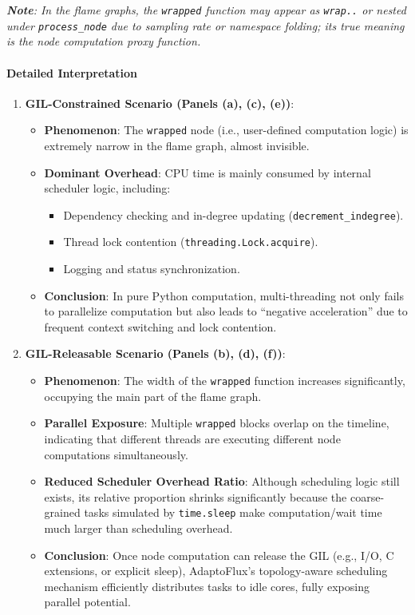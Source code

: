 \textit{\textbf{Note}: In the flame graphs, the \texttt{wrapped} function may appear as \texttt{wrap..} or nested under \texttt{process\_node} due to sampling rate or namespace folding; its true meaning is the node computation proxy function.}

\paragraph{Detailed Interpretation}

\begin{enumerate}
    \item \textbf{GIL-Constrained Scenario (Panels (a), (c), (e))}:
    \begin{itemize}
        \item \textbf{Phenomenon}: The \texttt{wrapped} node (i.e., user-defined computation logic) is extremely narrow in the flame graph, almost invisible.
        \item \textbf{Dominant Overhead}: CPU time is mainly consumed by internal scheduler logic, including:
        \begin{itemize}
            \item Dependency checking and in-degree updating (\texttt{decrement\_indegree}).
            \item Thread lock contention (\texttt{threading.Lock.acquire}).
            \item Logging and status synchronization.
        \end{itemize}
        \item \textbf{Conclusion}: In pure Python computation, multi-threading not only fails to parallelize computation but also leads to ``negative acceleration'' due to frequent context switching and lock contention.
    \end{itemize}
    
    \item \textbf{GIL-Releasable Scenario (Panels (b), (d), (f))}:
    \begin{itemize}
        \item \textbf{Phenomenon}: The width of the \texttt{wrapped} function increases significantly, occupying the main part of the flame graph.
        \item \textbf{Parallel Exposure}: Multiple \texttt{wrapped} blocks overlap on the timeline, indicating that different threads are executing different node computations simultaneously.
        \item \textbf{Reduced Scheduler Overhead Ratio}: Although scheduling logic still exists, its relative proportion shrinks significantly because the coarse-grained tasks simulated by \texttt{time.sleep} make computation/wait time much larger than scheduling overhead.
        \item \textbf{Conclusion}: Once node computation can release the GIL (e.g., I/O, C extensions, or explicit sleep), AdaptoFlux's topology-aware scheduling mechanism efficiently distributes tasks to idle cores, fully exposing parallel potential.
    \end{itemize}
\end{enumerate}

